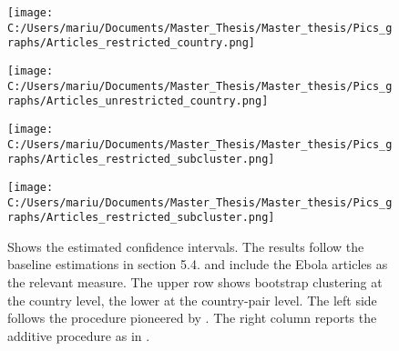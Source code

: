 \documentclass{article}
\begin{document}
\begin{figure}[!ht]
\begin{center}
\begin{minipage}[t]{0.9\textwidth}
\begin{minipage}[t]{0.5\linewidth} 
\texttt{[image: C:/Users/mariu/Documents/Master\_Thesis/Master\_thesis/Pics\_graphs/Articles\_restricted\_country.png]}\\
\vspace{1ex}
\end{minipage}\hfill%
\begin{minipage}[t]{0.5\linewidth}
\texttt{[image: C:/Users/mariu/Documents/Master\_Thesis/Master\_thesis/Pics\_graphs/Articles\_unrestricted\_country.png]}\\
\vspace{1ex}
\end{minipage}\hfill%

\begin{minipage}[t]{0.5\linewidth}
\texttt{[image: C:/Users/mariu/Documents/Master\_Thesis/Master\_thesis/Pics\_graphs/Articles\_restricted\_subcluster.png]}\\
\vspace{1ex}
\end{minipage}\hfill%
\begin{minipage}[t]{0.5\linewidth}
\texttt{[image: C:/Users/mariu/Documents/Master\_Thesis/Master\_thesis/Pics\_graphs/Articles\_restricted\_subcluster.png]}\\
\vspace{1ex}
\end{minipage}\hfill%
\caption{Shows the estimated confidence intervals. The results follow the baseline estimations in section 5.4. and include the Ebola articles as the relevant measure. The upper row shows bootstrap clustering at the country level, the lower at the country-pair level. The left side follows the procedure pioneered by \cite{cameron2008bootstrap}. The right column reports the additive procedure as in \cite{mackinnon2018wild}.} 
\label{Wild cluster bootstrap II}
\end{minipage}
\end{center}
\end{figure}


\vspace{8cm}
\end{document}

